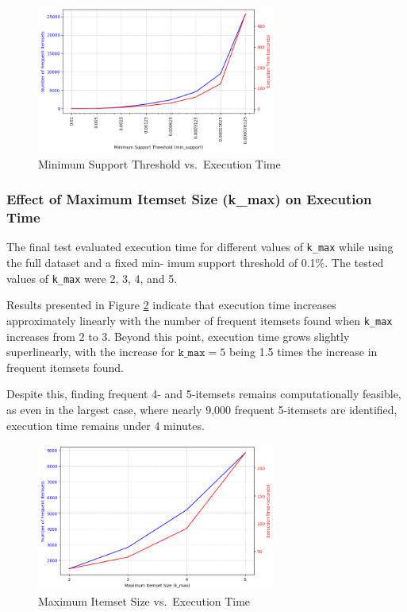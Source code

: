 \documentclass{Class/julia}
\begin{document}
\begin{figure}[!ht]
    \centering
    \includegraphics[width=0.7\textwidth]{min_support_vs_execution_time.png}
    \caption{Minimum Support Threshold vs.\ Execution Time}
    \label{fig:min_support_vs_execution_time}
\end{figure}

\subsubsection{Effect of Maximum Itemset Size (k\_max) on Execution Time}

The final test evaluated execution time for different values of \texttt{k\_max} while using the full dataset and a fixed min- imum support threshold of 0.1\%. The tested values of \texttt{k\_max} were 2, 3, 4, and 5.  

Results presented in Figure \ref{fig:k_max_vs_execution_time} indicate that execution time increases approximately linearly with the number of frequent itemsets found when \texttt{k\_max} increases from 2 to 3. Beyond this point, execution time grows slightly superlinearly, with the increase for \( \texttt{k\_max} = 5 \) being 1.5 times the increase in frequent itemsets found.

Despite this, finding frequent 4- and 5-itemsets remains computationally feasible, as even in the largest case, where nearly 9,000 frequent 5-itemsets are identified, execution time remains under 4 minutes.

\begin{figure}[!ht]
    \centering
    \includegraphics[width=0.7\textwidth]{k_max_vs_execution_time.png}
    \caption{Maximum Itemset Size vs.\ Execution Time}
    \label{fig:k_max_vs_execution_time}
\end{figure}
\end{document}
